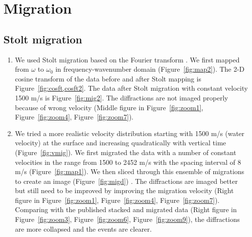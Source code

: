 \section{Migration}

\subsection{Stolt migration}

\begin{enumerate}
 
\item We used Stolt migration based on the Fourier transform \cite[]{GEO50-11-22192244}. We first mapped from $\omega$ to $\omega_0$ in frequency-wavenumber domain (Figure~\ref{fig:map2}). The 2-D cosine transform of the data before and after Stolt mapping is Figure~\ref{fig:cosft,cosft2}. The data after Stolt migration with constant velocity 1500 m/s is Figure~\ref{fig:mig2}. The diffractions are not imaged properly because of wrong velocity (Middle figure in Figure~\ref{fig:zoom1}, Figure~\ref{fig:zoom4}, Figure~\ref{fig:zoom7}). 

\item We tried a more realistic velocity distribution starting with 1500 m/s (water velocity) at the surface and increasing quadratically with vertical time (Figure~\ref{fig:vmig}). We first migrated the data with a number of constant velocities in the range from 1500 to 2452 m/s with the spacing interval of 8 m/s (Figure~\ref{fig:map1}). We then sliced through this ensemble of migrations to create an image (Figure~\ref{fig:migd}) \cite[]{GEO57-01-00510059}. The diffractions are imaged better but still need to be improved by improving the migration velocity (Right figure in Figure~\ref{fig:zoom1}, Figure~\ref{fig:zoom4}, Figure~\ref{fig:zoom7}). Comparing with the published stacked and migrated data (Right figure in Figure~\ref{fig:zoom3}, Figure~\ref{fig:zoom6}, Figure~\ref{fig:zoom9}), the diffractions are more collapsed and the events are clearer.


\end{enumerate}\clearpage

